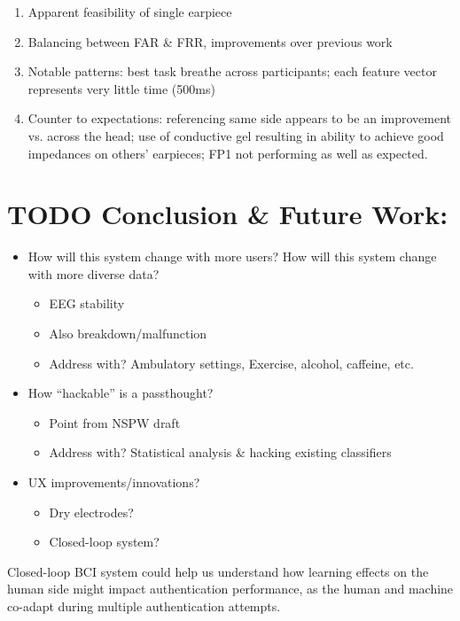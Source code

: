 \documentclass[11pt]{article}
\begin{document}
\begin{enumerate}
\item Apparent feasibility of single earpiece

\item Balancing between FAR \& FRR, improvements over previous work

\item Notable patterns: best task breathe across participants; each feature vector represents very little time (500ms)

\item Counter to expectations: referencing same side appears to be an improvement vs. across the head; use of conductive gel resulting in ability to achieve good impedances on others’ earpieces; FP1 not performing as well as expected.
\end{enumerate}

\section{{\bfseries\sffamily TODO} Conclusion \& Future Work:}
\label{sec:org29a90c8}

\begin{itemize}
\item How will this system change with more users? How will this system change with more diverse data?
\begin{itemize}
\item EEG stability
\item Also breakdown/malfunction
\item Address with? Ambulatory settings, Exercise, alcohol, caffeine, etc.
\end{itemize}
\item How “hackable” is a passthought?
\begin{itemize}
\item Point from NSPW draft
\item Address with? Statistical analysis \& hacking existing classifiers
\end{itemize}
\item UX improvements/innovations?
\begin{itemize}
\item Dry electrodes?
\item Closed-loop system?
\end{itemize}
\end{itemize}

Closed-loop BCI system could help us understand how learning effects
on the human side might impact authentication performance, as the human and machine
co-adapt during multiple authentication attempts.
\end{document}
